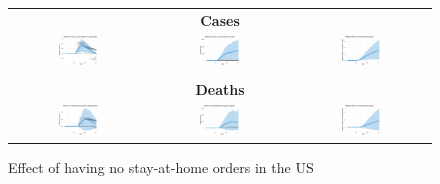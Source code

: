\documentclass[11pt,reqno,letter]{amsart}
\theoremstyle{definition}
\begin{document}
\begin{figure}[ht]
  \caption{Effect of having no stay-at-home orders in the US\label{fig:US-shelter}}
  \begin{minipage}{\linewidth}
    \centering
    \begin{tabular}{ccc}
      \multicolumn{3}{c}{\textbf{Cases}} \\
      \includegraphics[width=0.31\textwidth]{tables_and_figures/us-shelter-dgrowth_idx}
      &
        \includegraphics[width=0.31\textwidth]{tables_and_figures/us-shelter-dcases_idx}
      &

        \includegraphics[width=0.31\textwidth]{tables_and_figures/us-shelter-rcumu_idx}
      \\
      \\
      \multicolumn{3}{c}{\textbf{Deaths}} \\
      \includegraphics[width=0.31\textwidth]{tables_and_figures/us-shelter-dgrowth_deaths_idx}
      &
      \includegraphics[width=0.31\textwidth]{tables_and_figures/us-shelter-dcases_deaths_idx}
      &
        \includegraphics[width=0.31\textwidth]{tables_and_figures/us-shelter-rcumu_deaths_idx}
    \end{tabular}


\end{minipage}
\end{figure}
\end{document}
